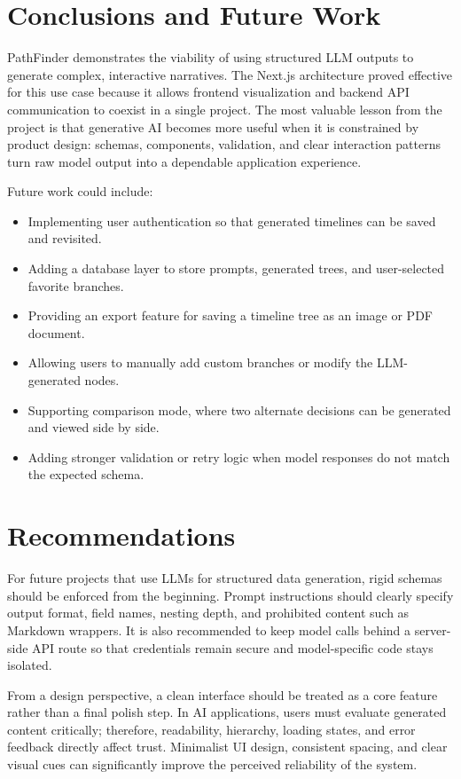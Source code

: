 \documentclass[12pt,a4paper]{report}
\begin{document}
\chapter{Conclusions and Future Work}
PathFinder demonstrates the viability of using structured LLM outputs to generate complex, interactive narratives. The Next.js architecture proved effective for this use case because it allows frontend visualization and backend API communication to coexist in a single project. The most valuable lesson from the project is that generative AI becomes more useful when it is constrained by product design: schemas, components, validation, and clear interaction patterns turn raw model output into a dependable application experience.

Future work could include:
\begin{itemize}
    \item Implementing user authentication so that generated timelines can be saved and revisited.
    \item Adding a database layer to store prompts, generated trees, and user-selected favorite branches.
    \item Providing an export feature for saving a timeline tree as an image or PDF document.
    \item Allowing users to manually add custom branches or modify the LLM-generated nodes.
    \item Supporting comparison mode, where two alternate decisions can be generated and viewed side by side.
    \item Adding stronger validation or retry logic when model responses do not match the expected schema.
\end{itemize}

\chapter{Recommendations}
For future projects that use LLMs for structured data generation, rigid schemas should be enforced from the beginning. Prompt instructions should clearly specify output format, field names, nesting depth, and prohibited content such as Markdown wrappers. It is also recommended to keep model calls behind a server-side API route so that credentials remain secure and model-specific code stays isolated.

From a design perspective, a clean interface should be treated as a core feature rather than a final polish step. In AI applications, users must evaluate generated content critically; therefore, readability, hierarchy, loading states, and error feedback directly affect trust. Minimalist UI design, consistent spacing, and clear visual cues can significantly improve the perceived reliability of the system.
\end{document}
